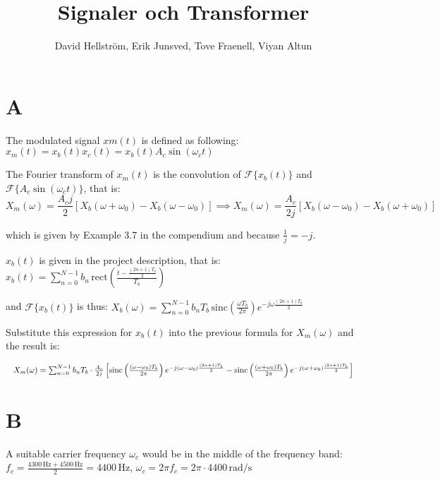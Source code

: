 \documentclass{article}[11]
\title{Signaler och Transformer}
\author{David Hellström, Erik Junsved, Tove Fraenell, Viyan Altun}
\date{}
\begin{document}
\setlength{\parskip}{1em} %
\setlength{\parindent}{0em} %

\maketitle

\newpage

\section{A}
The modulated signal $xm(t)$ is defined as following: $x_m(t) = x_b(t) x_c(t) = x_b(t) A_c \sin(\omega_c t)$

The Fourier transform of $x_m(t)$ is the convolution of $\mathcal{F} \{x_b(t)\}$
 and $\mathcal{F} \{ A_c \sin(\omega_c t) \}$, that is:
\begin{equation}
    X_m(\omega) = \frac{A_c j}{2} \left[ X_b(\omega + \omega_0) - X_b(\omega - \omega_0) \right] \implies
    X_m(\omega) = \frac{A_c}{2j} \left[ X_b(\omega - \omega_0) - X_b(\omega + \omega_0) \right]
\end{equation}



which is given by Example 3.7 in the compendium and because $\frac{1}{j} = -j$.


$x_b(t)$ is given in the project description, that is: $x_b(t) = \sum_{n=0}^{N-1} b_n \, \mathrm{rect} \left( \frac{t - \frac{(2n+1)T_b}{2}}{T_b} \right)$

and $\mathcal{F} \{x_b(t)\}$ is thus: $X_b(\omega) = \sum_{n=0}^{N-1} b_n T_b \, \text{sinc} \left( \frac{\omega T_b}{2 \pi} \right) e^{-j \omega \frac{(2n+1) T_b}{2}}$

Substitute this expression for \( x_b(t) \) into the previous formula for \( X_m(\omega) \) and the result is:

\begin{equation}
\resizebox{\textwidth}{!}{$
X_m(\omega) = \sum_{n=0}^{N-1} b_n T_b \cdot \frac{A_c}{2j} \left[ \text{sinc} \left( \frac{ (\omega - \omega_0) T_b}{2\pi} \right) e^{-j (\omega - \omega_0) \frac{(2n+1) T_b}{2}} - \text{sinc} \left( \frac{ (\omega + \omega_0) T_b}{2\pi} \right) e^{-j (\omega + \omega_0) \frac{(2n+1) T_b}{2}} \right]
$}
\end{equation}


\section{B}
A suitable carrier frequency $\omega_c$ would be in the middle of the frequency band: $f_c = \frac{4300 \, \text{Hz} + 4500 \, \text{Hz}}{2} = 4400 \, \text{Hz}$,
$\omega_c = 2\pi f_c = 2\pi \cdot 4400 \, \text{rad/s}$
\end{document}

